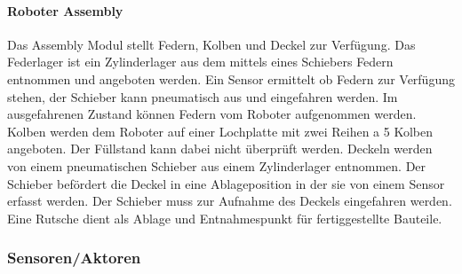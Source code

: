 \documentclass[11pt,a4paper,ngerman]{article}
\begin{document}
\paragraph{Roboter Assembly}
Das Assembly Modul stellt Federn, Kolben und Deckel zur Verfügung. Das Federlager ist ein Zylinderlager aus dem mittels eines Schiebers Federn entnommen und angeboten werden. Ein Sensor ermittelt ob Federn zur Verfügung stehen, der Schieber kann pneumatisch aus und eingefahren werden. Im ausgefahrenen Zustand können Federn vom Roboter aufgenommen werden.\newline
Kolben werden dem Roboter auf einer Lochplatte mit zwei Reihen a 5 Kolben angeboten. Der Füllstand kann dabei nicht überprüft werden.\newline
Deckeln werden von einem pneumatischen Schieber aus einem Zylinderlager entnommen. Der Schieber befördert die Deckel in eine Ablageposition in der sie von einem Sensor erfasst werden. Der Schieber muss zur Aufnahme des Deckels eingefahren werden.\newline
Eine Rutsche dient als Ablage und Entnahmespunkt für fertiggestellte Bauteile.
\subsubsection{Sensoren/Aktoren}
\end{document}
